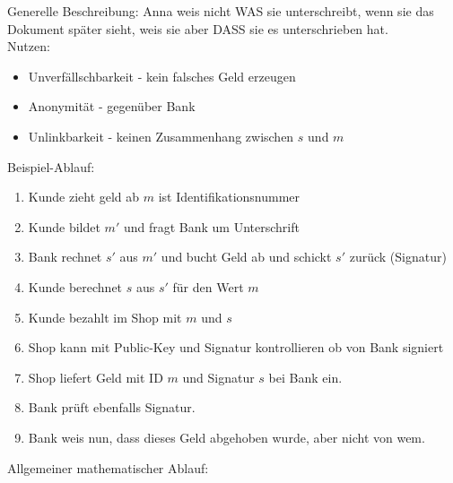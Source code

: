 \documentclass[12pt]{scrartcl}
\begin{document}
Generelle Beschreibung: Anna weis nicht WAS sie unterschreibt, wenn sie das Dokument später sieht,
weis sie aber DASS sie es unterschrieben hat.\\
Nutzen:
\begin{itemize}
    \item Unverfällschbarkeit - kein falsches Geld erzeugen
    \item Anonymität - gegenüber Bank
    \item Unlinkbarkeit - keinen Zusammenhang zwischen $s$ und $m$
\end{itemize}

\vspace{0.5cm}
\noindent
Beispiel-Ablauf:

\begin{enumerate}
    \item Kunde zieht geld ab $m$ ist Identifikationsnummer
    \item Kunde bildet $m'$ und fragt Bank um Unterschrift
    \item Bank rechnet $s'$ aus $m'$ und bucht Geld ab und schickt $s'$ zurück (Signatur)
    \item Kunde berechnet $s$ aus $s'$ für den Wert $m$ 
    \item Kunde bezahlt im Shop mit $m$ und $s$
    \item Shop kann mit Public-Key und Signatur kontrollieren ob von Bank signiert
    \item Shop liefert Geld mit ID $m$ und Signatur $s$ bei Bank ein.
    \item Bank prüft ebenfalls Signatur.
    \item Bank weis nun, dass dieses Geld abgehoben wurde, aber nicht von wem.
\end{enumerate}


\newpage
Allgemeiner mathematischer Ablauf:
\end{document}
